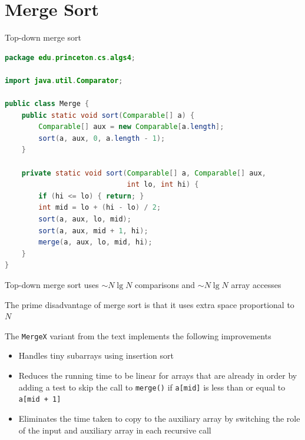 \documentclass[8pt,a4paper,compress]{beamer}
\begin{document}
\section{Merge Sort}
\begin{frame}[fragile]
\pause

Top-down merge sort

\begin{lstlisting}[language=Java]
package edu.princeton.cs.algs4;

import java.util.Comparator;

public class Merge {
    public static void sort(Comparable[] a) {
        Comparable[] aux = new Comparable[a.length]; 
        sort(a, aux, 0, a.length - 1);
    }
    
    private static void sort(Comparable[] a, Comparable[] aux, 
                             int lo, int hi) {
        if (hi <= lo) { return; }
        int mid = lo + (hi - lo) / 2;
        sort(a, aux, lo, mid); 
        sort(a, aux, mid + 1, hi); 
        merge(a, aux, lo, mid, hi);
    }
}
\end{lstlisting}
\end{frame}

\begin{frame}[fragile]
\pause

Trace of merge sort
\begin{center}
}
\end{center}
\end{frame}

\begin{frame}[fragile]
\pause

Top-down merge sort uses $\sim N\lg N$ comparisons and $\sim N\lg N$ array accesses

\pause
\bigskip

The prime disadvantage of merge sort is that it uses extra space proportional to $N$

\pause
\bigskip

The \lstinline{MergeX} variant from the text implements the following improvements

\begin{itemize}
\item Handles tiny subarrays using insertion sort
\item Reduces the running time to be linear for arrays that are already in order by adding a test to skip the call to \lstinline$merge()$ if \lstinline$a[mid]$ is less than or equal to \lstinline$a[mid + 1]$
\item Eliminates the time taken to copy to the auxiliary array by switching the role of the input and auxiliary array in each recursive call
\end{itemize}
\end{frame}
\end{document}
